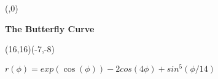 

\Defnum(\n,0)
\newcount\m
\newdimen\x
\newdimen\y
\newdimen\z


\begin{center}
{\Huge \bf{The Butterfly Curve}}
\bigskip

\begin{lapdf}(16,16)(-7,-8)
 \def\Px(#1,#2){\Dset(\x,#1) \y=4\x \z=0.0714\x
  \Cos(\Np\x,\x) \Exp(\Np\x,#2) \Cos(\Np\y,\y) \Mul(\y,2)
  \Sin(\Np\z,\z) \Pot(\Np\z,5,\z) \Sub(#2,\y) \Add(#2,\z) #2=2.2#2}

\end{lapdf}

$r(\phi)=exp(\cos(\phi))-2cos(4\phi)+sin^5(\phi/14)$
\end{center}

